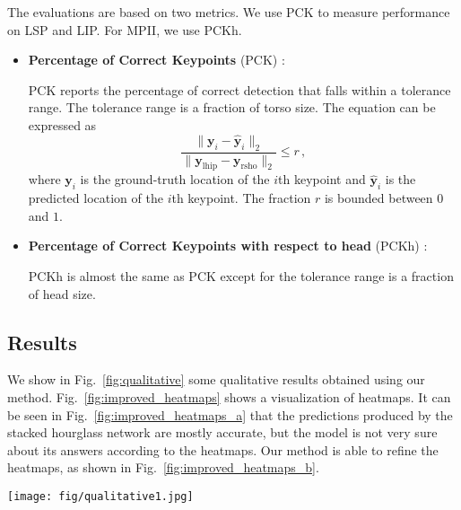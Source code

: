 \documentclass[10pt,twocolumn,letterpaper]{article}
\begin{document}
The evaluations are based on two metrics. We use PCK to measure performance on LSP and LIP. For MPII, we use PCKh.

\begin{itemize}
\item \textbf{Percentage of Correct Keypoints} (PCK) \cite{YangR11}:

PCK reports the percentage of correct detection that falls within a tolerance range. The tolerance range is a fraction of torso size. The equation can be expressed as
\begin{equation}
	\frac{\| \mathbf{y}_i - \hat{\mathbf{y}}_i \| _2}{\| \mathbf{y}_{\mathrm{lhip}} - \mathbf{y}_{\mathrm{rsho}} \| _2} \leq r \,,
\end{equation}
where $\mathbf{y}_i$ is the ground-truth location of the $i$th keypoint and $\hat{\mathbf{y}}_i$ is the predicted location of the $i$th keypoint. The fraction $r$ is bounded between $0$ and $1$.

\item \textbf{Percentage of Correct Keypoints with respect to head} (PCKh) \cite{AndrilukaPGS14}:

PCKh is almost the same as PCK except for the tolerance range is a fraction of head size.
\end{itemize}


\subsection{Results}

We show in Fig.~\ref{fig:qualitative} some qualitative results obtained using our method. Fig.~\ref{fig:improved_heatmaps} shows a visualization of heatmaps. It can be seen in Fig.~\ref{fig:improved_heatmaps_a} that the predictions produced by the stacked hourglass network \cite{NewellYD16} are mostly accurate, but the model is not very sure about its answers according to the heatmaps. Our method is able to refine the heatmaps, as shown in Fig.~\ref{fig:improved_heatmaps_b}.


 \begin{figure*}
    \centering
    \texttt{[image: fig/qualitative1.jpg]}
    \caption{ Qualitative results. The red and orange lines indicate the left side, and the blue line indicates the right side. Our method can generate more plausible and structural poses than \cite{NewellYD16}.}
    \label{fig:qualitative}
\end{figure*}
 
\end{document}
